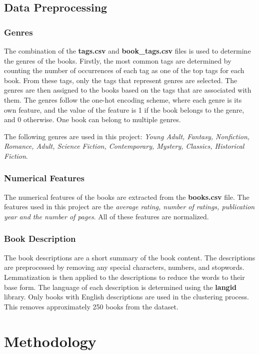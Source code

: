 \documentclass[english]{mvi-report}
\begin{document}
\subsection{Data Preprocessing}
\subsubsection{Genres}

The combination of the \textbf{tags.csv} and \textbf{book\_tags.csv} files is used to determine the genres of the books. Firstly, the most common tags are determined by counting the number of occurrences of each tag as one of the top tags for each book. From these tags, only the tags that represent genres are selected. The genres are then assigned to the books based on the tags that are associated with them. The genres follow the one-hot encoding scheme, where each genre is its own feature, and the value of the feature is 1 if the book belongs to the genre, and 0 otherwise. One book can belong to multiple genres.


The following genres are used in this project: \textit{Young Adult, Fantasy, Nonfiction, Romance, Adult, Science Fiction, Contemporary, Mystery, Classics, Historical Fiction}.

\subsubsection{Numerical Features}
The numerical features of the books are extracted from the \textbf{books.csv} file. The features used in this project are the \textit{average rating, number of ratings, publication year and the number of pages}. All of these features are normalized.

\subsubsection{Book Description}
The book descriptions are a short summary of the book content. The descriptions are preprocessed by removing any special characters, numbers, and stopwords. Lemmatization is then applied to the descriptions to reduce the words to their base form.
The language of each description is determined using the \textbf{langid} library. Only books with English descriptions are used in the clustering process. This removes approximately 250 books from the dataset.

\section{Methodology}
\end{document}
